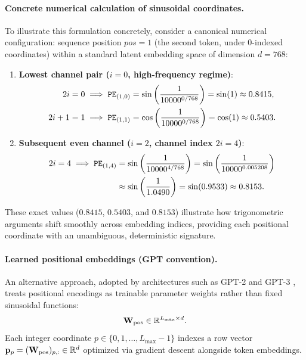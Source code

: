 \documentclass[../../main.tex]{subfiles}
\begin{document}
\paragraph{Concrete numerical calculation of sinusoidal coordinates.}
To illustrate this formulation concretely, consider a canonical numerical configuration: sequence position $pos = 1$ (the second token, under $0$-indexed coordinates) within a standard latent embedding space of dimension $d = 768$:
\begin{enumerate}
    \item \textbf{Lowest channel pair ($i = 0$, high-frequency regime)}:
    \begin{align}
        2i = 0 &\implies \text{\texttt{PE}}_{(1, 0)} = \sin\left(\frac{1}{10000^{0 / 768}}\right) = \sin(1) \approx 0.8415, \\
        2i+1 = 1 &\implies \text{\texttt{PE}}_{(1, 1)} = \cos\left(\frac{1}{10000^{0 / 768}}\right) = \cos(1) \approx 0.5403.
    \end{align}
    \item \textbf{Subsequent even channel ($i = 2$, channel index $2i = 4$)}:
    \begin{align}
        2i = 4 \implies \text{\texttt{PE}}_{(1, 4)} &= \sin\left(\frac{1}{10000^{4 / 768}}\right) = \sin\left(\frac{1}{10000^{0.005208}}\right) \nonumber \\
        &\approx \sin\left(\frac{1}{1.0490}\right) = \sin(0.9533) \approx 0.8153.
    \end{align}
\end{enumerate}
These exact values ($0.8415$, $0.5403$, and $0.8153$) illustrate how trigonometric arguments shift smoothly across embedding indices, providing each positional coordinate with an unambiguous, deterministic signature.

\paragraph{Learned positional embeddings (GPT convention).}
An alternative approach, adopted by architectures such as GPT-2 and GPT-3 \cite{radford2019, brown2020}, treats positional encodings as trainable parameter weights rather than fixed sinusoidal functions:
\begin{equation}
\label{eq:pos_embedding_layer}
\mathbf{W}_{\text{pos}} \in \mathbb{R}^{L_{\max} \times d}.
\end{equation}
Each integer coordinate $p \in \{0, 1, \dots, L_{\max}-1\}$ indexes a row vector $\mathbf{p}_p = (\mathbf{W}_{\text{pos}})_{p, :} \in \mathbb{R}^d$ optimized via gradient descent alongside token embeddings.
\end{document}
